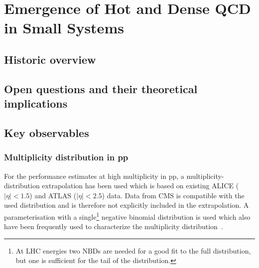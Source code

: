 \documentclass[../report.tex]{subfiles}
\begin{document}
\section{Emergence of Hot and Dense QCD in Small Systems}

\subsection{Historic overview}

\subsection{Open questions and their theoretical implications}


\subsection{Key observables}

\subsubsection{Multiplicity distribution in pp}

For the performance estimates at high multiplicity in pp, a multiplicity-distribution extrapolation has been used which is based on existing ALICE ($|\eta| < 1.5$) and ATLAS ($|\eta|< 2.5$) data. Data from CMS is compatible with the used distribution and is therefore not explicitly included in the extrapolation. A parameterisation with a single\footnote{At LHC energies two NBDs are needed for a good fit to the full distribution, but one is sufficient for the tail of the distribution.} negative binomial distribution is used which also have been frequently used to characterize the multiplicity distribution~\cite{GrosseOetringhaus:2009kz,ALICE:2017pcy}.
\end{document}
